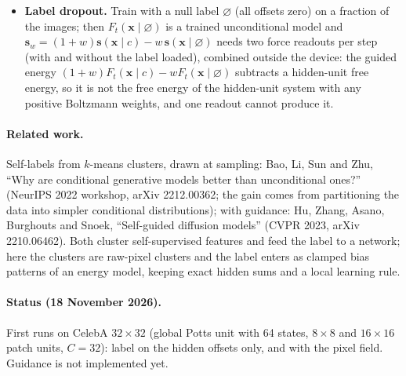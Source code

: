 \documentclass[11pt,a4paper]{article}
\newcommand{\vx}{\bm{x}}
\begin{document}
\begin{itemize}
  evaluations per step. Summing the label as a further fast hidden unit would give the same mixture, but that unit
  couples to every other hidden unit's bias, so the factorisation is lost (the sum is still exact as $C$ separate
  sums).
\item \textbf{Label dropout.} Train with a null label $\varnothing$ (all offsets zero) on a fraction of the images; then
  $F_t(\vx\mid\varnothing)$ is a trained unconditional model and $\bm s_w=(1+w)\bm s(\vx\mid c)-w\,\bm s(\vx\mid\varnothing)$
  needs two force readouts per step (with and without the label loaded), combined outside the device: the guided
  energy $(1+w)F_t(\vx\mid c)-wF_t(\vx\mid\varnothing)$ subtracts a hidden-unit free energy, so it is not the free
  energy of the hidden-unit system with any positive Boltzmann weights, and one readout cannot produce it.
\end{itemize}

\paragraph{Related work.} Self-labels from $k$-means clusters, drawn at sampling: Bao, Li, Sun and Zhu,
``Why are conditional generative models better than unconditional ones?'' (NeurIPS 2022 workshop, arXiv
2212.00362; the gain comes from partitioning the data into simpler conditional distributions); with guidance: Hu,
Zhang, Asano, Burghouts and Snoek, ``Self-guided diffusion models'' (CVPR 2023, arXiv 2210.06462). Both cluster
self-supervised features and feed the label to a network; here the clusters are raw-pixel clusters and the label
enters as clamped bias patterns of an energy model, keeping exact hidden sums and a local learning rule.

\paragraph{Status (18 November 2026).} First runs on CelebA $32\times32$ (global Potts unit with 64 states, $8\times8$ and
$16\times16$ patch units, $C=32$): label on the hidden offsets only, and with the pixel field. Guidance is not
implemented yet.

\end{document}
